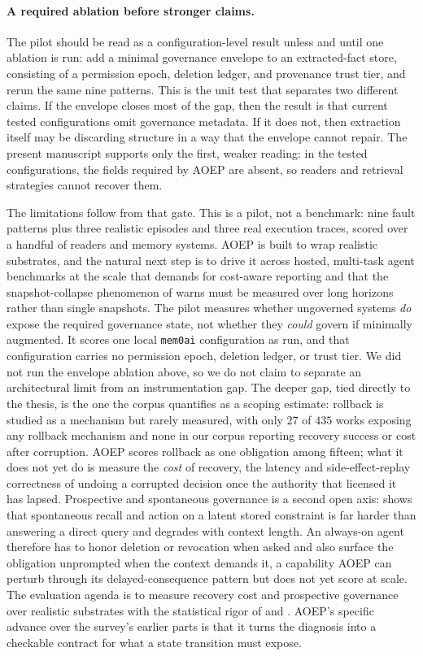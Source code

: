\paragraph{A required ablation before stronger claims.} The pilot should be read as a configuration-level result unless and until one ablation is run: add a minimal governance envelope to an extracted-fact store, consisting of a permission epoch, deletion ledger, and provenance trust tier, and rerun the same nine patterns. This is the unit test that separates two different claims. If the envelope closes most of the gap, then the result is that current tested configurations omit governance metadata. If it does not, then extraction itself may be discarding structure in a way that the envelope cannot repair. The present manuscript supports only the first, weaker reading: in the tested configurations, the fields required by AOEP are absent, so readers and retrieval strategies cannot recover them.

The limitations follow from that gate. This is a pilot, not a benchmark: nine fault patterns plus three realistic episodes and three real execution traces, scored over a handful of readers and memory systems. AOEP is built to wrap realistic substrates, and the natural next step is to drive it across hosted, multi-task agent benchmarks at the scale that \citet{kapoor2024aiagentsthatmatter} demands for cost-aware reporting and that the snapshot-collapse phenomenon of \citet{zheng2026seagym} warns must be measured over long horizons rather than single snapshots. The pilot measures whether ungoverned systems \emph{do} expose the required governance state, not whether they \emph{could} govern if minimally augmented. It scores one local \texttt{mem0ai} configuration as run, and that configuration carries no permission epoch, deletion ledger, or trust tier. We did not run the envelope ablation above, so we do not claim to separate an architectural limit from an instrumentation gap. The deeper gap, tied directly to the thesis, is the one the corpus quantifies as a scoping estimate: rollback is studied as a mechanism but rarely measured, with only $27$ of $435$ works exposing any rollback mechanism and none in our corpus reporting recovery success or cost after corruption. AOEP scores rollback as one obligation among fifteen; what it does not yet do is measure the \emph{cost} of recovery, the latency and side-effect-replay correctness of undoing a corrupted decision once the authority that licensed it has lapsed. Prospective and spontaneous governance is a second open axis: \citet{zhang2026triggerbench} shows that spontaneous recall and action on a latent stored constraint is far harder than answering a direct query and degrades with context length. An always-on agent therefore has to honor deletion or revocation when asked and also surface the obligation unprompted when the context demands it, a capability AOEP can perturb through its delayed-consequence pattern but does not yet score at scale. The evaluation agenda is to measure recovery cost and prospective governance over realistic substrates with the statistical rigor of \citet{miller2024errorbarsevals} and \citet{madaan2024quantifyingvariance}. AOEP's specific advance over the survey's earlier parts is that it turns the diagnosis into a checkable contract for what a state transition must expose.
